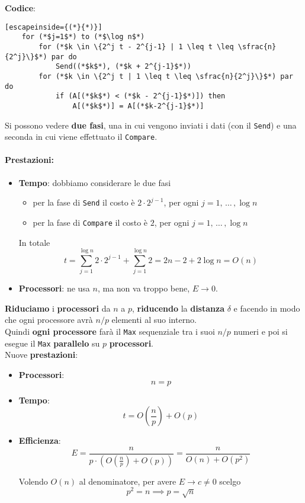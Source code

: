 \textbf{Codice}: 
\begin{lstlisting}[escapeinside={(*}{*)}]
	for (*$j=1$*) to (*$\log n$*)
		for (*$k \in \{2^j t - 2^{j-1} | 1 \leq t \leq \sfrac{n}{2^j}\}$*) par do
			Send((*$k$*), (*$k + 2^{j-1}$*))
		for (*$k \in \{2^j t | 1 \leq t \leq \sfrac{n}{2^j}\}$*) par do
			if (A[(*$k$*) < (*$k - 2^{j-1}$*)]) then 
				A[(*$k$*)] = A[(*$k-2^{j-1}$*)]
\end{lstlisting}

Si possono vedere \textbf{due fasi}, una in cui vengono inviati i dati (con il \texttt{Send}) e una seconda in cui viene effettuato il \texttt{Compare}.\\

\paragraph{Prestazioni:}
\begin{itemize}
	\item \textbf{Tempo}: dobbiamo considerare le due fasi
	\begin{itemize}
		\item per la fase di \texttt{Send} il costo è $2 \cdot 2^{j-1}$, per ogni $j = 1, \, \dots \, , \log n$
		\item per la fase di \texttt{Compare} il costo è $2$, per ogni $j = 1, \, \dots \,, \log n$
	\end{itemize}
	In totale
	$$ t = \sum_{j=1}^{\log n} 2 \cdot 2^{j-1} + \sum_{j=1}^{\log n} 2 = 2n-2 + 2 \log n = O(n) $$
	\nn
	
	\item \textbf{Processori}: ne usa $n$, ma non va troppo bene, $E \rightarrow 0$.\\
\end{itemize}

\newpage

\textbf{Riduciamo} i \textbf{processori} da $n$ a $p$, \textbf{riducendo} la \textbf{distanza} $\delta$ e facendo in modo che ogni processore avrà $n/p$ elementi al suo interno. \\

Quindi \textbf{ogni processore} farà il \texttt{Max} sequenziale tra i suoi $n/p$ numeri e poi si esegue il \texttt{Max} \textbf{parallelo} su $p$ \textbf{processori}. \\

Nuove \textbf{prestazioni}: 
\begin{itemize}
	\item \textbf{Processori}: 
	$$ n = p$$
	
	\item \textbf{Tempo}:
	$$ t = O\left(\frac{n}{p}\right) + O(p)$$
	
	\item \textbf{Efficienza}:
	$$ E = \frac{n}{ p \cdot \left(O\left(\frac{n}{p}\right) + O(p)\right)} = \frac{n}{O(n) + O(p^2)}$$
	
	Volendo $O(n)$ al denominatore, per avere $E \rightarrow c \neq 0$ scelgo 
	$$p^2 = n \implies p = \sqrt{n}$$
	\nn
\end{itemize}

